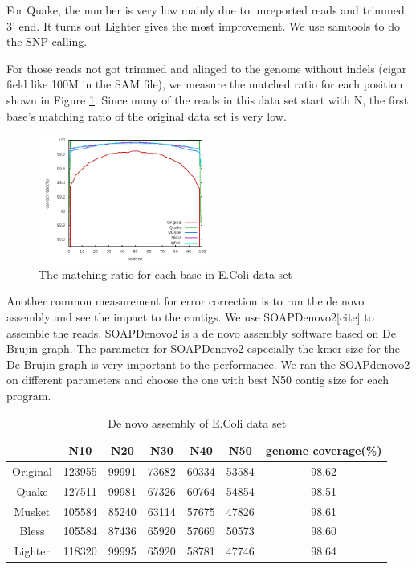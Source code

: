 \documentclass[10pt]{article}
\begin{document}
For Quake, the number is very low mainly due to unreported reads and trimmed 3' end. It turns out Lighter gives the most improvement. We use samtools to do the SNP calling. 

For those reads not got trimmed and alinged to the genome without indels (cigar field like 100M in the SAM file), we measure the matched ratio for each position shown in Figure \ref{fig:ecoli_perbase}. Since many of the reads in this data set start with N, the first base's matching ratio of the original data set is very low.

\begin{figure}[h!]
\begin{center}
\includegraphics[width=0.5\textwidth]{per_base.jpg}
\caption{The matching ratio for each base in E.Coli data set\label{fig:ecoli_perbase}}
\end{center}
\end{figure}

Another common measurement for error correction is to run the de novo assembly and see the impact to the contigs. We use SOAPDenovo2[cite] to assemble the reads. SOAPDenovo2 is a de novo assembly software based on De Brujin graph. The parameter for SOAPDenovo2 especially the kmer size for the De Brujin graph is very important to the performance. We ran the SOAPdenovo2 on different parameters and choose the one with best N50 contig size for each program. 

\begin{table}
\begin{tabular}{|c|c|c|c|c|c|c|} \hline
 		& N10 & N20 & N30 & N40 & N50 & genome coverage(\%)\\ \hline
Original	&			123955	&99991	&73682	&60334	&53584 &98.62	 \\ \hline
Quake		&		127511	&99981	&67326	&60764	&54854 &98.51	\\ \hline
Musket		&		105584	&85240	&63114	&57675	&47826 &98.61	\\ \hline
Bless		&		105584	&87436	&65920	&57669	&50573 &98.60	 \\ \hline
Lighter		&		118320	&99995	&65920	&58781	&47746 &98.64 \\ \hline
\end{tabular}
\caption{De novo assembly of E.Coli data set\label{table:ecoli_sd2}}
\end{table}
\end{document}
